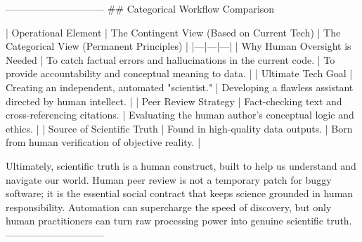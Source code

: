 ------------------------------
## Categorical Workflow Comparison

| Operational Element | The Contingent View (Based on Current Tech) | The Categorical View (Permanent Principles) |
|---|---|---|
| Why Human Oversight is Needed | To catch factual errors and hallucinations in the current code. | To provide accountability and conceptual meaning to data. |
| Ultimate Tech Goal | Creating an independent, automated "scientist." | Developing a flawless assistant directed by human intellect. |
| Peer Review Strategy | Fact-checking text and cross-referencing citations. | Evaluating the human author's conceptual logic and ethics. |
| Source of Scientific Truth | Found in high-quality data outputs. | Born from human verification of objective reality. |

Ultimately, scientific truth is a human construct, built to help us understand and navigate our world. Human peer review is not a temporary patch for buggy software; it is the essential social contract that keeps science grounded in human responsibility.
Automation can supercharge the speed of discovery, but only human practitioners can turn raw processing power into genuine scientific truth.
------------------------------
